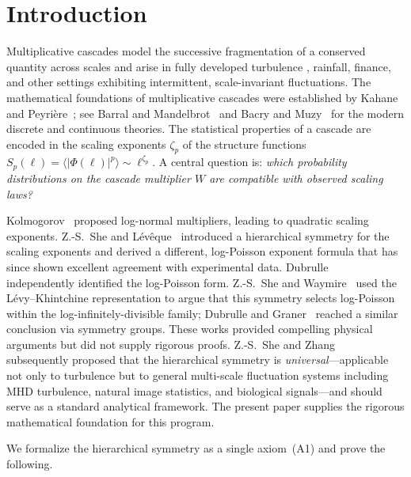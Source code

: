\documentclass[pdflatex,sn-mathphys-num]{sn-jnl}
\theoremstyle{thmstyleone}
\theoremstyle{thmstyletwo}
\theoremstyle{thmstylethree}
\begin{document}
\maketitle

\section{Introduction}

Multiplicative cascades model the successive fragmentation of a
conserved quantity across scales and arise in fully developed
turbulence \cite{K62,Man74}, rainfall, finance, and other settings
exhibiting intermittent, scale-invariant fluctuations.  The
mathematical foundations of multiplicative cascades were established
by Kahane and Peyri\`ere~\cite{KP76}; see Barral and
Mandelbrot~\cite{BM02} and Bacry and Muzy~\cite{BM03} for the modern
discrete and continuous theories.  The statistical properties of a
cascade are encoded in the scaling exponents $\zeta_p$ of the
structure functions $S_p(\ell) = \langle |\Phi(\ell)|^p \rangle \sim
\ell^{\zeta_p}$.  A central question is: \emph{which probability
distributions on the cascade multiplier $W$ are compatible with
observed scaling laws?}

Kolmogorov~\cite{K62} proposed log-normal multipliers, leading to
quadratic scaling exponents.  Z.-S.~She and
L\'ev\^eque~\cite{SL94} introduced a hierarchical symmetry for the
scaling exponents and derived a different, log-Poisson exponent
formula that has since shown excellent agreement with experimental
data.  Dubrulle~\cite{Dub94} independently identified the log-Poisson
form.  Z.-S.~She and Waymire~\cite{SW95} used the
L\'evy--Khintchine representation to argue that this symmetry selects
log-Poisson within the log-infinitely-divisible family; Dubrulle and
Graner~\cite{DG96} reached a similar conclusion via symmetry groups.
These works provided compelling physical arguments but did not supply
rigorous proofs.  Z.-S.~She and Zhang~\cite{SZ09} subsequently
proposed that the hierarchical symmetry is \emph{universal}---applicable
not only to turbulence but to general multi-scale fluctuation systems
including MHD turbulence, natural image statistics, and biological
signals---and should serve as a standard analytical framework.  The
present paper supplies the rigorous mathematical foundation for this
program.

We formalize the hierarchical symmetry as a single axiom~(A1) and
prove the following.
\end{document}
